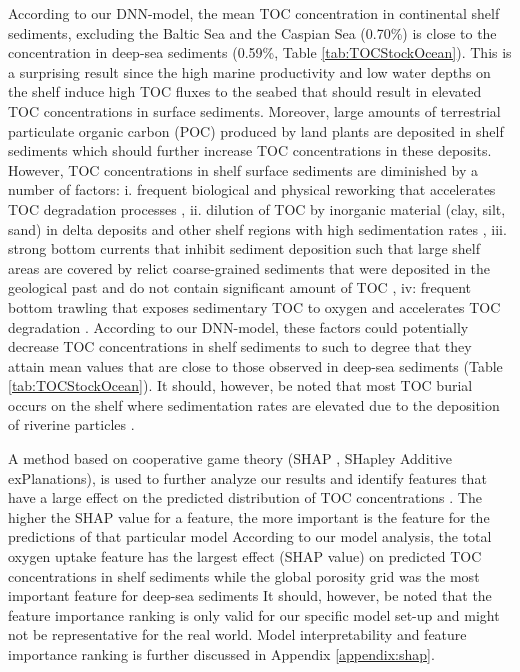 \documentclass[journal abbreviation, manuscript]{copernicus}
\begin{document}
According to our DNN-model, the mean TOC concentration in continental shelf sediments, excluding the Baltic Sea and the Caspian Sea (0.70\%) is close to the concentration in deep-sea sediments (0.59\%, Table \ref{tab:TOCStockOcean}). This is a surprising result since the high marine productivity and low water depths on the shelf induce high TOC fluxes to the seabed that should result in elevated TOC concentrations in surface sediments. Moreover, large amounts of terrestrial particulate organic carbon (POC) produced by land plants are deposited in shelf sediments \citep{Burdige2005} which should further increase TOC concentrations in these deposits. However, TOC concentrations in shelf surface sediments are diminished by a number of factors: i.  frequent biological and physical reworking that accelerates TOC degradation processes \citep{song2022global}, ii. dilution of TOC by inorganic material (clay, silt, sand) in delta deposits and other shelf regions with high sedimentation rates \citep{Berner1982}, iii. strong bottom currents that inhibit sediment deposition such that large shelf areas are covered by relict coarse-grained sediments that were deposited in the geological past and do not contain significant amount of TOC \citep{emery1968relict}, iv: frequent bottom trawling that exposes sedimentary TOC to oxygen and accelerates TOC degradation \citep{atwood2020}. According to our DNN-model, these factors could potentially decrease TOC concentrations in shelf sediments to such to degree that they attain mean values that are close to those observed in deep-sea sediments (Table \ref{tab:TOCStockOcean}). It should, however, be noted that most TOC burial occurs on the shelf where sedimentation rates are elevated due to the deposition of riverine particles \citep{Bradley2022}.

A method based on cooperative game theory (SHAP , SHapley Additive exPlanations), is used to further analyze our results and identify features that have a large effect on the predicted distribution of TOC concentrations \citep{lundberg2017shap}. The higher the SHAP value for a feature, the more important is the feature for the predictions of that particular model According to our model analysis, the total oxygen uptake feature \citep{TOU_JORGENSEN2022} has the largest effect (SHAP value) on predicted TOC concentrations in shelf sediments while the global porosity grid \citep{Martin2005Porosity} was the most important feature for deep-sea sediments It should, however, be noted that the feature importance ranking is only valid for our specific model set-up and might not be representative for the real world. Model interpretability and feature importance ranking is further discussed in Appendix \ref{appendix:shap}.
\end{document}
